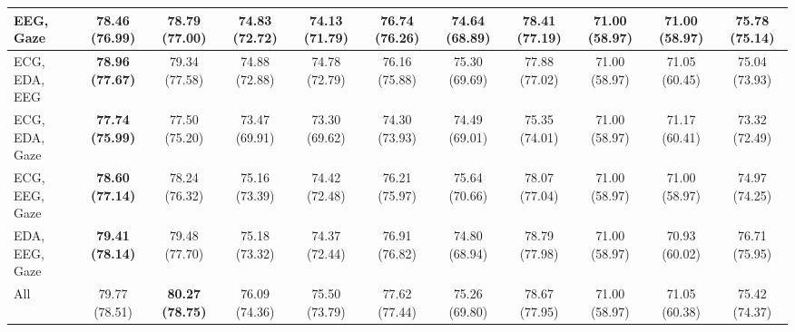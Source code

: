 \begin{table}[!htbp]
\begin{tabular}{lcccccccccc}
    EEG, Gaze & 78.46 (76.99) & 78.79 (77.00) & 74.83 (72.72) & 74.13 (71.79) & 76.74 (76.26) & 74.64 (68.89) & \textbf{78.41 (77.19)} & 71.00 (58.97) & 71.00 (58.97) & 75.78 (75.14) \\
    \midrule
    ECG, EDA, EEG & \textbf{78.96 (77.67)} & 79.34 (77.58) & 74.88 (72.88) & 74.78 (72.79) & 76.16 (75.88) & 75.30 (69.69) & 77.88 (77.02) & 71.00 (58.97) & 71.05 (60.45) & 75.04 (73.93) \\
    ECG, EDA, Gaze & \textbf{77.74 (75.99)} & 77.50 (75.20) & 73.47 (69.91) & 73.30 (69.62) & 74.30 (73.93) & 74.49 (69.01) & 75.35 (74.01) & 71.00 (58.97) & 71.17 (60.41) & 73.32 (72.49) \\
    ECG, EEG, Gaze & \textbf{78.60 (77.14)} & 78.24 (76.32) & 75.16 (73.39) & 74.42 (72.48) & 76.21 (75.97) & 75.64 (70.66) & 78.07 (77.04) & 71.00 (58.97) & 71.00 (58.97) & 74.97 (74.25) \\
    EDA, EEG, Gaze & \textbf{79.41 (78.14)} & 79.48 (77.70) & 75.18 (73.32) & 74.37 (72.44) & 76.91 (76.82) & 74.80 (68.94) & 78.79 (77.98) & 71.00 (58.97) & 70.93 (60.02) & 76.71 (75.95) \\
    \midrule
    All & 79.77 (78.51) & \textbf{80.27 (78.75)} & 76.09 (74.36) & 75.50 (73.79) & 77.62 (77.44) & 75.26 (69.80) & 78.67 (77.95) & 71.00 (58.97) & 71.05 (60.38) & 75.42 (74.37) \\
    \bottomrule
  \end{tabular}
\end{table}
